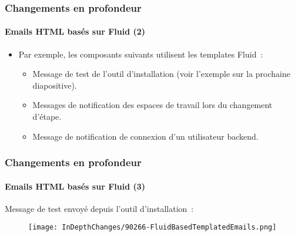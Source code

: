 
\begin{frame}[fragile]
	\frametitle{Changements en profondeur}
	\framesubtitle{Emails HTML basés sur Fluid (2)}

	\begin{itemize}
		\item Par exemple, les composants suivants utilisent les templates Fluid~:

			\begin{itemize}
				\item Message de test de l'outil d'installation (voir l'exemple sur la prochaine diapositive).
				\item Messages de notification des espaces de travail lors du changement d'étape.
				\item Message de notification de connexion d'un utilisateur backend.
			\end{itemize}

	\end{itemize}

\end{frame}


\begin{frame}[fragile]
	\frametitle{Changements en profondeur}
	\framesubtitle{Emails HTML basés sur Fluid (3)}

	Message de test envoyé depuis l'outil d'installation~:

	\begin{figure}
		\texttt{[image: InDepthChanges/90266-FluidBasedTemplatedEmails.png]}
	\end{figure}

\end{frame}



